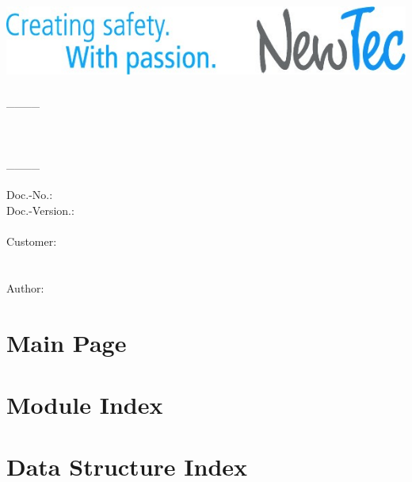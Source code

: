 \documentclass[twoside]{book}
\newcommand{\+}{\discretionary{\mbox{\scriptsize$\hookleftarrow$}}{}{}}
\newcommand{\clearemptydoublepage}{%
  \newpage{\pagestyle{empty}\cleardoublepage}%
}
\begin{document}
\hypersetup{pageanchor=false,
             bookmarks=true,
             bookmarksnumbered=true,
             pdfencoding=unicode
            }
\begin{titlepage}
{\hfill \includegraphics[scale=0.2]{110012_00992_00882_IMG-NewTecSloganLogo.jpg}}\\
\vspace*{4cm}\\
{\Large \textcolor{ntblue}{\_\_\_\_}}\\
\\
{\huge \textcolor{ntblue}{\textit{\NTDocumenttitle}}}\\
{\Large \textcolor{ntblue}{\textit{\NTProjectname}}}\\
{\Large \textcolor{ntblue}{\_\_\_\_}}\\
\vspace*{1.5cm}\\
{\small Doc.-No.:\quad\NTDocumentnumber}\\
{\small Doc.-Version.:\quad\NTVersion}\\
\vspace*{5cm}\\
Customer:\\
\NTCompanyCustomer\\
\vspace*{1.5cm}\\
Author:\\
\NTCompanyNT
\end{titlepage}
\clearemptydoublepage
\tableofcontents
\clearemptydoublepage
\hypersetup{pageanchor=true}

\chapter{Main Page}
\label{index}\hypertarget{index}{}
\chapter{Module Index}

\chapter{Data Structure Index}

\end{document}
